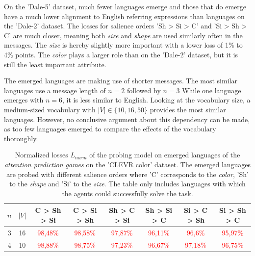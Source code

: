 On the 'Dale-5' dataset, much fewer languages emerge and those that do emerge have a much lower alignment to English referring expressions than languages on the 'Dale-2' dataset.
The losses for salience orders 'Sh > Si > C' and 'Si > Sh > C' are much closer, meaning both \emph{size} and \emph{shape} are used similarly often in the messages.
The \emph{size} is hereby slightly more important with a lower loss of 1\% to 4\% points.
The \emph{color} plays a larger role than on the 'Dale-2' dataset, but it is still the least important attribute.

The emerged languages are making use of shorter messages.
The most similar languages use a message length of $n=2$ followed by $n=3$
While one language emerges with $n=6$, it is less similar to English.
Looking at the vocabulary size, a medium-sized vocabulary with $|V| \in \{10,16,50\}$ provides the most similar languages.
However, no conclusive argument about this dependency can be made, as too few languages emerged to compare the effects of the vocabulary thoroughly.

\begin{table}[ht]
    \centering
    \begin{tabular}{cc|c|c|c|c|c|c}
        \toprule
        $n$ & $|V|$ & \textbf{C > Sh > Si}     & \textbf{C > Si > Sh}     & \textbf{Sh > C > Si}     & \textbf{Sh > Si > C}     & \textbf{Si > C > Sh}     & \textbf{Si > Sh > C}     \\\midrule
        {3} & {16}  & \textcolor{red}{98,48\%} & \textcolor{red}{98,58\%} & \textcolor{red}{97,87\%} & \textcolor{red}{96,11\%} & \textcolor{red}{96,6\%}  & \textcolor{red}{95,97\%} \\
        {4} & {10}  & \textcolor{red}{98,88\%} & \textcolor{red}{98,75\%} & \textcolor{red}{97,23\%} & \textcolor{red}{96,67\%} & \textcolor{red}{97,18\%} & \textcolor{red}{96,75\%} \\
        \bottomrule
    \end{tabular}
    \caption{Normalized losses $L_{norm}$ of the probing model on emerged languages of the \emph{attention prediction games} on the 'CLEVR color' dataset. The emerged languages are probed with different salience orders where 'C' corresponds to the \emph{color}, 'Sh' to the \emph{shape} and 'Si' to the \emph{size}. The table only includes languages with which the agents could successfully solve the task.}
    \label{tab:probing:attention-predictor:colour}
\end{table}

